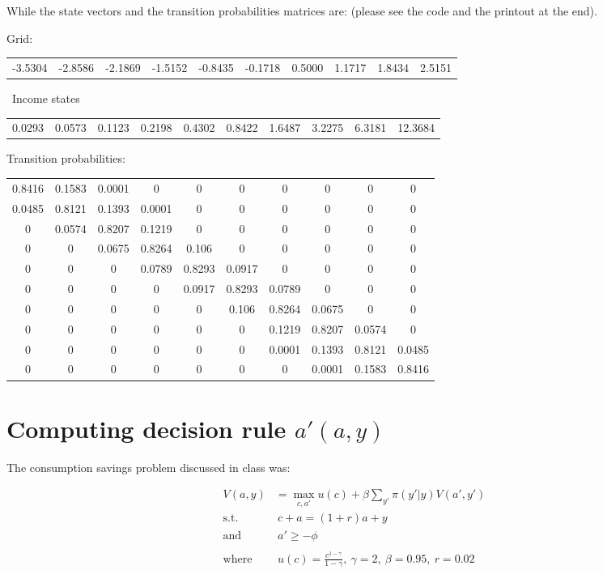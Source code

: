 \documentclass[letter,11pt]{article}
\begin{document}
While the state vectors and the transition probabilities matrices are: (please see the code and the printout at the end).

Grid: \\
\begin{tabular}{  | c | c| c| c |c |c |c |c |c |c |}
   -3.5304  & -2.8586 &  -2.1869  &  -1.5152 & -0.8435 &  -0.1718 &   0.5000 &   1.1717 & 1.8434 &  2.5151
\end{tabular}
\
Income states \\
\begin{tabular}{  | c | c| c| c |c |c |c |c |c |c |}
    0.0293  &  0.0573 &   0.1123 &   0.2198  &  0.4302  &  0.8422  &  1.6487  &  3.2275   & 6.3181& 12.3684
\end{tabular}

Transition probabilities:\\
\begin{tabular}{c c c c c c c c c c} \hline
 0.8416	&	0.1583	&	0.0001	&	0	&	0	&	0	&	0	&	0	&	0	&	0	\\
0.0485	&	0.8121	&	0.1393	&	0.0001	&	0	&	0	&	0	&	0	&	0	&	0	\\
0	&	0.0574	&	0.8207	&	0.1219	&	0	&	0	&	0	&	0	&	0	&	0	\\
0	&	0	&	0.0675	&	0.8264	&	0.106	&	0	&	0	&	0	&	0	&	0	\\
0	&	0	&	0	&	0.0789	&	0.8293	&	0.0917	&	0	&	0	&	0	&	0	\\
0	&	0	&	0	&	0	&	0.0917	&	0.8293	&	0.0789	&	0	&	0	&	0	\\
0	&	0	&	0	&	0	&	0	&	0.106	&	0.8264	&	0.0675	&	0	&	0	\\
0	&	0	&	0	&	0	&	0	&	0	&	0.1219	&	0.8207	&	0.0574	&	0	\\
0	&	0	&	0	&	0	&	0	&	0	&	0.0001	&	0.1393	&	0.8121	&	0.0485	\\
0	&	0	&	0	&	0	&	0	&	0	&	0	&	0.0001	&	0.1583	&	0.8416	\\ \hline
\end{tabular}


\section{Computing decision rule $a'(a,y)$}
\hfill

The consumption savings problem discussed in class was:

\begin{align*}
V(a,y) & = \max_{c,a'} u(c) + \beta \sum_{y'} \pi(y'|y) V(a',y') \\
\text{s.t. } & \ c+a = (1+r) a + y \\
\text{and} & \ a' \ge -\phi \\ \\
\text{where } & \ u(c) = \frac{c^{1-\gamma}}{1-\gamma}, \  \gamma=2, \ \beta=0.95, \ r=0.02
\end{align*}
\end{document}
